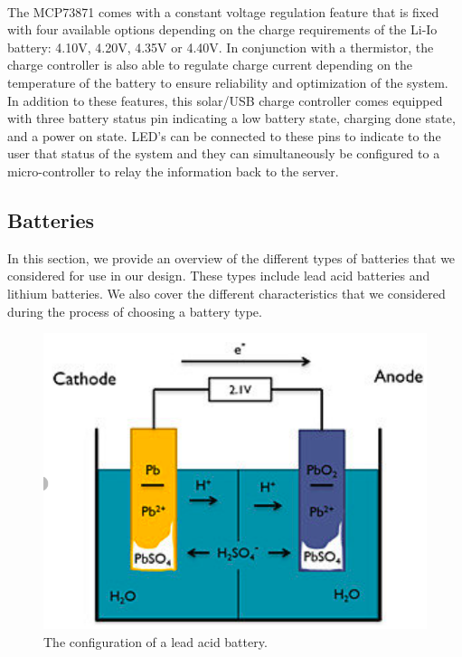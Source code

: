 \paragraph{}
The MCP73871 comes with a constant voltage regulation feature that is fixed with four available options depending on the charge requirements of the Li-Io battery: 4.10V, 4.20V, 4.35V or 4.40V. In conjunction with a thermistor, the charge controller is also able to regulate charge current depending on the temperature of the battery to ensure reliability and optimization of the system. In addition to these features, this solar/USB charge controller comes equipped with three battery status pin indicating a low battery state, charging done state, and a power on state. LED's can be connected to these pins to indicate to the user that status of the system and they can simultaneously be configured to a micro-controller to relay the information back to the server.     

\subsection{Batteries}
In this section, we provide an overview of the different types of batteries that we considered for use in our design. These types include lead acid batteries and lithium batteries. We also cover the different characteristics that we considered during the process of choosing a battery type.

\begin{figure}
    \centering
    \includegraphics[scale=0.25]{figures/lead-acid-battery.png}
    \caption{The configuration of a lead acid battery.}
    \label{lead-acid-battery} 
\end{figure}

